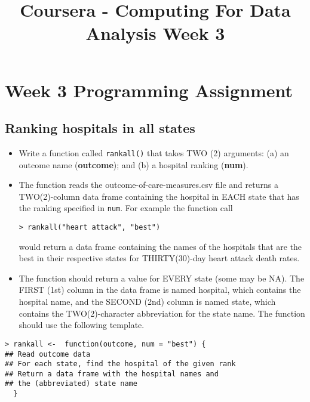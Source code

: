 \documentclass[]{article}
\title{Coursera - Computing For Data Analysis Week 3}
\begin{document}
\section{Week 3 Programming Assignment}
\subsection{Ranking hospitals in all states}

\begin{itemize}
\item Write a function called \texttt{rankall()} that takes TWO (2) arguments: (a) an outcome name (\textbf{outcome}); and (b) a hospital ranking (\textbf{num}). 

\item The function reads the outcome-of-care-measures.csv file and returns a TWO(2)-column data frame containing the hospital in EACH 
state that has the ranking specified in \texttt{num}.  For example the function call
\begin{verbatim}
> rankall("heart attack", "best")
\end{verbatim}
                                                     
would return a data frame containing the names of the hospitals that are the best in their respective states for THIRTY(30)-day 
heart attack death rates. 

\item The function should return a value for EVERY state (some may be NA). The FIRST (1st) column in the data 
frame is named hospital, which contains the hospital name, and the SECOND (2nd) column is named state, which contains the 
TWO(2)-character abbreviation for the state name. 
The function should use the following template.
\end{itemize}


\begin{framed}
\begin{verbatim}
> rankall <-  function(outcome, num = "best") {                                       
## Read outcome data                                                    
## For each state, find the hospital of the given rank                  
## Return a data frame with the hospital names and 
## the (abbreviated) state name                                 
  }                          
\end{verbatim}
\end{framed}
\end{document}
